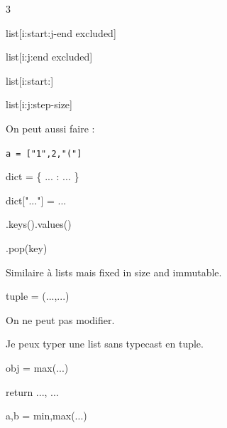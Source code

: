 \documentclass[a4paper,10pt]{article}
\begin{document}
\begin{multicols}{3}
\columnbreak

\begin{tcolorbox}[title=Extraction d'éléments]
list[i:start:j-end excluded]

list[i:j:end excluded]

list[i:start:]

list[i:j:step-size]

\vspace{2mm}

On peut aussi faire :

\texttt{a = ["1",2,"("]}
\end{tcolorbox}

\begin{tcolorbox}[title=Dictionnaires]
dict = \{ ... : ... \}

\vspace{2mm}

dict["..."] = ...

\vspace{2mm}
.keys()\quad .values()

.pop(key)
\end{tcolorbox}

\begin{tcolorbox}[title=Tuples]
Similaire à lists mais fixed in size and immutable.

\vspace{2mm}

tuple = (...,...)

\vspace{2mm}

On ne peut pas modifier.

Je peux typer une list sans typecast en tuple.
\end{tcolorbox}

\begin{tcolorbox}[title=Fonctions utiles]
obj = max(...)

return ..., ...

\vspace{2mm}

a,b = min,max(...)
\end{tcolorbox}

\end{multicols}

\newpage

\end{document}
